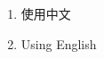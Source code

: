\renewcommand\theenumi{\roman{enumi}}
\renewcommand\labelenumi{(\theenumi)}
\begin{enumerate}
  \item 使用中文
  \item Using English
\end{enumerate}
